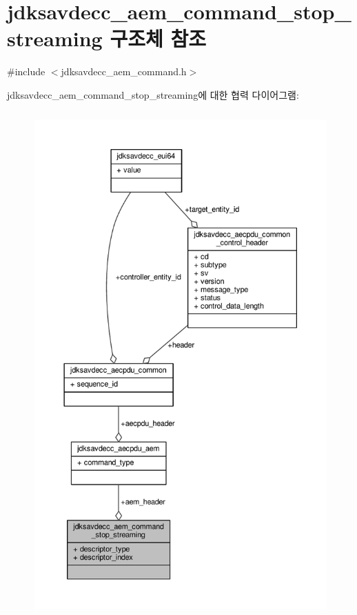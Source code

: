\hypertarget{structjdksavdecc__aem__command__stop__streaming}{}\section{jdksavdecc\+\_\+aem\+\_\+command\+\_\+stop\+\_\+streaming 구조체 참조}
\label{structjdksavdecc__aem__command__stop__streaming}


{\ttfamily \#include $<$jdksavdecc\+\_\+aem\+\_\+command.\+h$>$}



jdksavdecc\+\_\+aem\+\_\+command\+\_\+stop\+\_\+streaming에 대한 협력 다이어그램\+:
\nopagebreak
\begin{figure}[H]
\begin{center}
\leavevmode
\includegraphics[height=550pt]{structjdksavdecc__aem__command__stop__streaming__coll__graph}
\end{center}
\end{figure}
